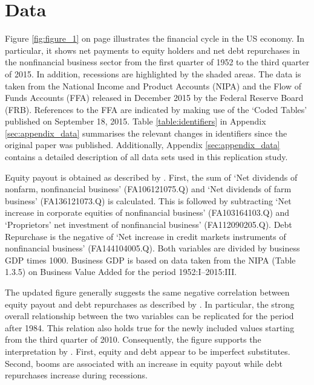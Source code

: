 \section{Data}
\label{sec:data}



Figure \ref{fig:figure_1} on page \pageref{fig:figure_1} illustrates the financial cycle in the US economy. In particular, it shows net payments to equity holders and net debt repurchases in the nonfinancial business sector from the first quarter of 1952 to the third quarter of 2015. In addition, recessions are highlighted by the shaded areas. The data is taken from the National Income and Product Accounts (NIPA) and the Flow of Funds Accounts (FFA) released in December 2015 by the Federal Reserve Board (FRB). References to the FFA are indicated by making use of the ‘Coded Tables’ published on September 18, 2015. Table \ref{table:identifiers} in Appendix \ref{sec:appendix_data} summarises the relevant changes in identifiers since the original paper was published. Additionally, Appendix \ref{sec:appendix_data} contains a detailed description of all data sets used in this replication study.

Equity payout is obtained as described by \citeauthor{JERMANNfinancial}. First, the sum of ‘Net dividends of nonfarm, nonfinancial business’ (FA106121075.Q) and ‘Net dividends of farm business’ (FA136121073.Q) is calculated. This is followed by subtracting ‘Net increase in corporate equities of nonfinancial business’ (FA103164103.Q) and ‘Proprietors’ net investment of nonfinancial business’ (FA112090205.Q). Debt Repurchase is the negative of ‘Net increase in credit markets instruments of nonfinancial business’ (FA144104005.Q). Both variables are divided by business GDP times 1000. Business GDP is based on data taken from the NIPA (Table 1.3.5) on Business Value Added for the period 1952:I--2015:III.

The updated figure generally suggests the same negative correlation between equity payout and debt repurchases as described by \citeauthor{JERMANNfinancial}. In particular, the strong overall relationship between the two variables can be replicated for the period after 1984. This relation also holds true for the newly included values starting from the third quarter of 2010. Consequently, the figure supports the interpretation by \citeauthor{JERMANNfinancial}. First, equity and debt appear to be imperfect substitutes. Second, booms are associated with an increase in equity payout while debt repurchases increase during recessions.

